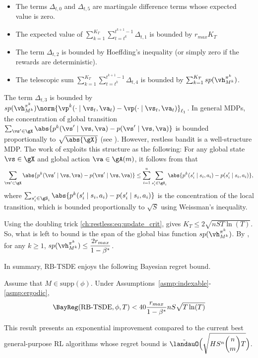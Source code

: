 \begin{itemize}
    \item The terms $\Delta_{t,0}$ and $\Delta_{t,5}$ are martingale difference terms whose expected value is zero.
    \item The expected value of $\sum_{k=1}^{K_T}\sum_{t=t^k}^{t^{k+1}-1}\Delta_{t,1}$ is bounded by $r_{max} K_T$ \cite[Appendix~A.2]{akbarzadeh2022learning}
    \item The term $\Delta_{t,2}$ is bounded by Hoeffding's inequality (or simply zero if the rewards are deterministic).
    \item The telescopic sum $\sum_{k=1}^{K_T}\sum_{t=t^k}^{t^{k+1}-1} \Delta_{t,4}$ is bounded by $\sum_{k=1}^{K_T} sp(\vh^{\pi^k}_{M^k})$.
\end{itemize}

The term $\Delta_{t,3}$ is bounded by $sp(\vh^{\pi^k}_{M^k})\norm{\vp^k(\cdot\mid \vs_t,\va_t)-\vp(\cdot\mid \vs_t,\va_t)}_{\ell_1}$.
In general MDPs, the concentration of global transition $\sum_{\vs'\in\gX} \abs{p^k(\vs'\mid \vs,\va) -p(\vs'\mid \vs,\va)}$ is bounded proportionally to $\sqrt{\abs{\gX}}$ (see \cite{qian2020concentration}).
However, restless bandit is a well-structure MDP.
The work of \cite{akbarzadeh2022learning} exploits this structure as the following:
For any global state $\vs\in\gX$ and global action $\va\in\gA(m)$, it follows from \cite[Lemma~13]{jung2019thompson} that
\begin{align*}
    \sum_{\vs'\in\gX} \abs{p^k(\vs'\mid \vs,\va) -p(\vs'\mid \vs,\va)}
    \le \sum_{i=1}^{n} \sum_{s'_i\in\gS_i} \abs{p^k(s'_i\mid s_i,a_i) -p(s'_i\mid s_i,a_i)},
\end{align*}
where $\sum_{s'_i\in\gS_i} \abs{p^k(s'_i\mid s_i,a_i) -p(s'_i\mid s_i,a_i)}$ is the concentration of the local transition, which is bounded proportionally to $\sqrt{S}$ using Weissman's inequality.

Using the doubling trick \eqref{ch:restless:eq:update_crit}, \cite[Lemma~A.1]{akbarzadeh2022learning} gives $K_T\le2\sqrt{nST\ln(T)}$. So, what is left to bound is the span of the global bias function $sp(\vh^{\pi^k}_{M^k})$.
By \cite[Lemma~5.1]{akbarzadeh2022learning}, for any $k\ge1$, $sp(\vh^{\pi^k}_{M^k})\le \displaystyle\frac{2r_{max}}{1-\beta^*}$.

In summary, RB-TSDE \cite{akbarzadeh2022learning} enjoys the following Bayesian regret bound.
\begin{prop}
    Assume that $M\in\mathrm{supp}(\phi)$.
Under Assumptions~\ref{asmp:indexable}-\ref{asmp:ergodic}, 
    \begin{equation}
        \label{eq:rb_tsde_rg}
        \BayReg(\textnormal{RB-TSDE},\phi,T) < 40\frac{r_{max}}{1-\beta^*}nS\sqrt{T\ln(T)}
    \end{equation}
\end{prop}
This result presents an exponential improvement compared to the current best general-purpose RL algorithms whose regret bound is $\tilde{\landauO}\displaystyle\Bigl(\sqrt{HS^n{n \choose m}T}\Bigr)$.

